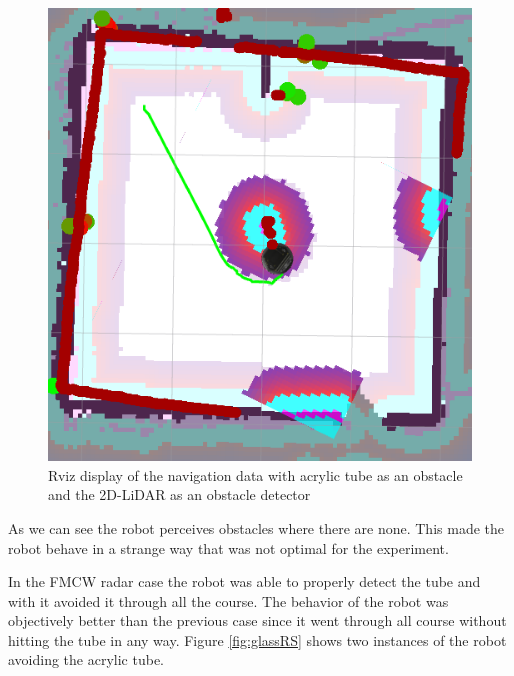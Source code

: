 \begin{figure}[ht!]
\centerline{\includegraphics [width=0.5 \textwidth]{imgs/chapter5/rvizglassscan.png}}
\caption[Navigation data with acrylic tube as an obstacle and with \ac{LiDAR}]{Rviz display of the navigation data with acrylic tube as an obstacle and the 2D-\ac{LiDAR} as an obstacle detector}
\label{fig:rvizglassradar}
\end{figure}
As we can see the robot perceives obstacles where there are none. This made the robot behave in a strange way that was not optimal for the experiment.


In the \ac{FMCW} \ac{radar} case the robot was able to properly detect the tube and with it avoided it through all the course. The behavior of the robot was objectively better than the previous case since it went through all course without hitting the tube in any way. Figure \ref{fig:glassRS} shows two instances of the robot avoiding the acrylic tube.

